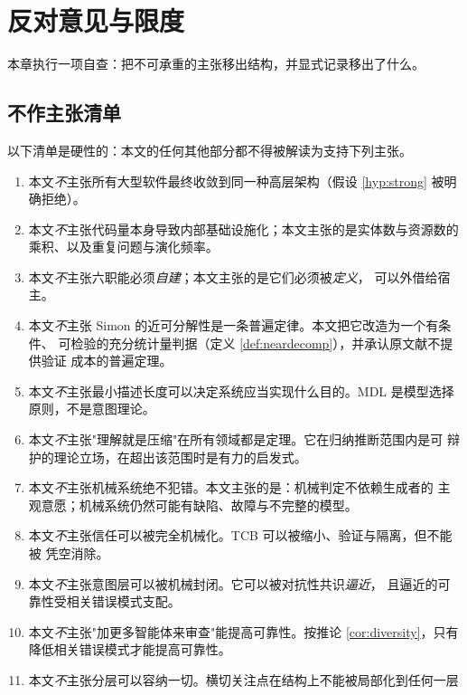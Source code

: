\chapter{反对意见与限度}\label{ch:objections}

本章执行一项自查：把不可承重的主张移出结构，并显式记录移出了什么。

\section{不作主张清单}

以下清单是硬性的：本文的任何其他部分都不得被解读为支持下列主张。

\begin{enumerate}[label=(N\arabic*)]
\item 本文\emph{不}主张所有大型软件最终收敛到同一种高层架构（假设
      \ref{hyp:strong} 被明确拒绝）。
\item 本文\emph{不}主张代码量本身导致内部基础设施化；本文主张的是实体数与资源数的
      乘积、以及重复问题与演化频率。
\item 本文\emph{不}主张六职能必须\emph{自建}；本文主张的是它们必须被\emph{定义}，
      可以外借给宿主。
\item 本文\emph{不}主张 Simon 的近可分解性是一条普遍定律。本文把它改造为一个有条件、
      可检验的充分统计量判据（定义 \ref{def:neardecomp}），并承认原文献不提供验证
      成本的普遍定理。
\item 本文\emph{不}主张最小描述长度可以决定系统应当实现什么目的。MDL 是模型选择
      原则，不是意图理论。
\item 本文\emph{不}主张"理解就是压缩"在所有领域都是定理。它在归纳推断范围内是可
      辩护的理论立场，在超出该范围时是有力的启发式。
\item 本文\emph{不}主张机械系统绝不犯错。本文主张的是：机械判定不依赖生成者的
      主观意愿；机械系统仍然可能有缺陷、故障与不完整的模型。
\item 本文\emph{不}主张信任可以被完全机械化。TCB 可以被缩小、验证与隔离，但不能被
      凭空消除。
\item 本文\emph{不}主张意图层可以被机械封闭。它可以被对抗性共识\emph{逼近}，
      且逼近的可靠性受相关错误模式支配。
\item 本文\emph{不}主张"加更多智能体来审查"能提高可靠性。按推论
      \ref{cor:diversity}，只有降低相关错误模式才能提高可靠性。
\item 本文\emph{不}主张分层可以容纳一切。横切关注点在结构上不能被局部化到任何一层

\end{enumerate}
